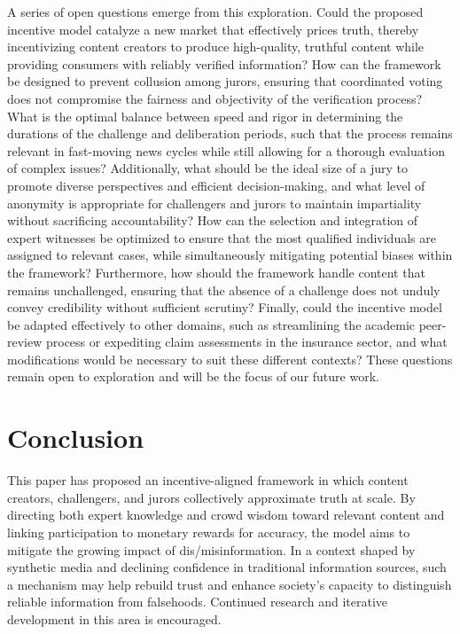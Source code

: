 \documentclass{article}
\begin{document}
A series of open questions emerge from this exploration. Could the proposed incentive model catalyze a new market that effectively prices truth, thereby incentivizing content creators to produce high-quality, truthful content while providing consumers with reliably verified information? How can the framework be designed to prevent collusion among jurors, ensuring that coordinated voting does not compromise the fairness and objectivity of the verification process? What is the optimal balance between speed and rigor in determining the durations of the challenge and deliberation periods, such that the process remains relevant in fast-moving news cycles while still allowing for a thorough evaluation of complex issues? Additionally, what should be the ideal size of a jury to promote diverse perspectives and efficient decision-making, and what level of anonymity is appropriate for challengers and jurors to maintain impartiality without sacrificing accountability? How can the selection and integration of expert witnesses be optimized to ensure that the most qualified individuals are assigned to relevant cases, while simultaneously mitigating potential biases within the framework? Furthermore, how should the framework handle content that remains unchallenged, ensuring that the absence of a challenge does not unduly convey credibility without sufficient scrutiny? Finally, could the incentive model be adapted effectively to other domains, such as streamlining the academic peer-review process or expediting claim assessments in the insurance sector, and what modifications would be necessary to suit these different contexts? These questions remain open to exploration and will be the focus of our future work.

\section{Conclusion}

This paper has proposed an incentive-aligned framework in which content creators, challengers, and jurors collectively approximate truth at scale. By directing both expert knowledge and crowd wisdom toward relevant content and linking participation to monetary rewards for accuracy, the model aims to mitigate the growing impact of dis/misinformation. In a context shaped by synthetic media and declining confidence in traditional information sources, such a mechanism may help rebuild trust and enhance society’s capacity to distinguish reliable information from falsehoods. Continued research and iterative development in this area is encouraged.
\end{document}
